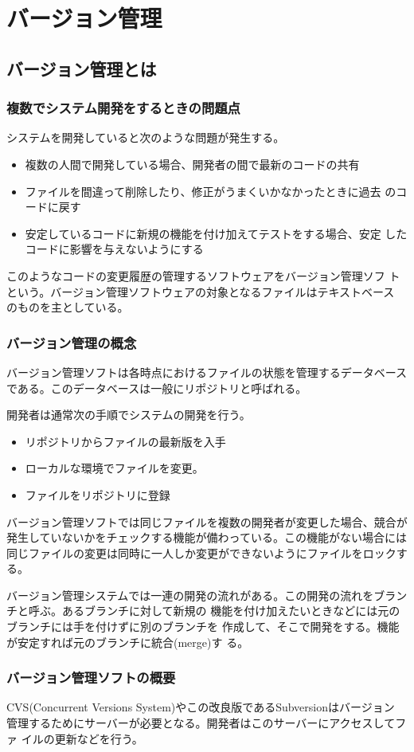 \chapter{バージョン管理}
\section{バージョン管理とは}
\subsection{複数でシステム開発をするときの問題点}
システムを開発していると次のような問題が発生する。
\begin{itemize}
 \item 複数の人間で開発している場合、開発者の間で最新のコードの共有
 \item ファイルを間違って削除したり、修正がうまくいかなかったときに過去
       のコードに戻す
 \item 安定しているコードに新規の機能を付け加えてテストをする場合、安定
       したコードに影響を与えないようにする
\end{itemize}
このようなコードの変更履歴の管理するソフトウェアをバージョン管理ソフ
トという。バージョン管理ソフトウェアの対象となるファイルはテキストベース
のものを主としている。
\subsection{バージョン管理の概念}
バージョン管理ソフトは各時点におけるファイルの状態を管理するデータベース
である。このデータベースは一般にリポジトリと呼ばれる。

開発者は通常次の手順でシステムの開発を行う。
\begin{itemize}
 \item リポジトリからファイルの最新版を入手
 \item ローカルな環境でファイルを変更。
 \item ファイルをリポジトリに登録
\end{itemize}
バージョン管理ソフトでは同じファイルを複数の開発者が変更した場合、競合が
発生していないかをチェックする機能が備わっている。この機能がない場合には
同じファイルの変更は同時に一人しか変更ができないようにファイルをロックす
る。

バージョン管理システムでは一連の開発の流れがある。この開発の流れをブラン
チと呼ぶ。あるブランチに対して新規の
機能を付け加えたいときなどには元のブランチには手を付けずに別のブランチを
作成して、そこで開発をする。機能が安定すれば元のブランチに統合(merge)す
る。
\subsection{バージョン管理ソフトの概要}
CVS(Concurrent Versions System)やこの改良版であるSubversionはバージョン
管理するためにサーバーが必要となる。開発者はこのサーバーにアクセスしてファ
イルの更新などを行う。

